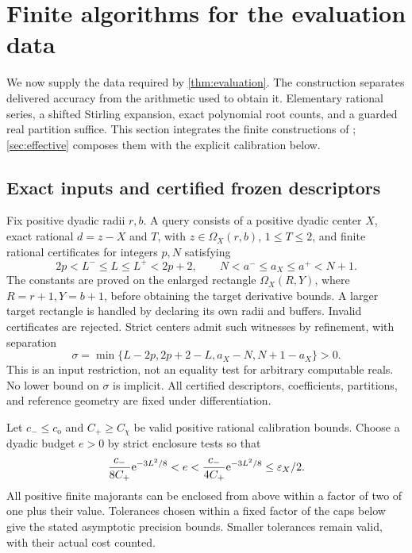 \section{Finite algorithms for the evaluation data}
\label{sec:providers}
We now supply the data required by \cref{thm:evaluation}.
The construction separates delivered accuracy from the arithmetic used
to obtain it. Elementary rational series, a shifted Stirling expansion,
exact polynomial root counts, and a guarded real partition suffice.
This section integrates the finite constructions of \cite{rec09,rec10};
\cref{sec:effective} composes them with the explicit calibration below.

\subsection{Exact inputs and certified frozen descriptors}
\label{subsec:input-class}
Fix positive dyadic radii \(r,b\). A query consists of a positive dyadic
center \(X\), exact rational \(d=z-X\) and \(T\), with
\(z\in\Omega_X(r,b)\), \(1\le T\le2\), and finite rational
certificates for integers \(p,N\) satisfying
\begin{equation}
 2p<L^-\le L\le L^+<2p+2,\qquad
 N<a^-\le a_X\le a^+<N+1.
 \label{eq:descriptor-certificates}
\end{equation}
The constants are proved on the enlarged rectangle
\(\Omega_X(R,Y)\), where \(R=r+1,Y=b+1\), before obtaining the
target derivative bounds. A larger target rectangle is handled by
declaring its own radii and buffers.
Invalid certificates are rejected. Strict centers admit such witnesses
by refinement, with separation
\begin{equation}
 \sigma=\min\{L-2p,2p+2-L,a_X-N,N+1-a_X\}>0.
 \label{eq:center-separation}
\end{equation}
This is an input restriction, not an equality test for arbitrary
computable reals. No lower bound on \(\sigma\) is implicit.
All certified descriptors, coefficients, partitions, and reference
geometry are fixed under differentiation.

Let \(c_-\le c_{\mathrm o}\) and \(C_+\ge C_\chi\) be valid
positive rational calibration bounds. Choose a dyadic budget \(e>0\)
by strict enclosure tests so that
\begin{equation}
 \frac{c_-}{8C_+}\mathrm e^{-3L^2/8}<e<
 \frac{c_-}{4C_+}\mathrm e^{-3L^2/8}\le\varepsilon_X/2.
 \label{eq:comparable-budget}
\end{equation}
All positive finite majorants can be enclosed from above within a factor
of two of one plus their value. Tolerances chosen within a fixed factor
of the caps below give the stated asymptotic precision bounds. Smaller
tolerances remain valid, with their actual cost counted.

